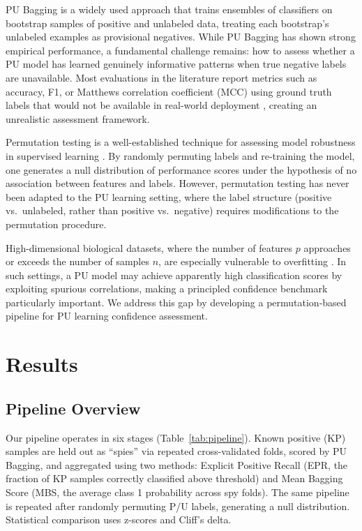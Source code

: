 \documentclass[11pt]{article}
\begin{document}
PU Bagging \citep{mordelet2014} is a widely used approach that trains ensembles of classifiers on bootstrap samples of positive and unlabeled data, treating each bootstrap's unlabeled examples as provisional negatives. While PU Bagging has shown strong empirical performance, a fundamental challenge remains: how to assess whether a PU model has learned genuinely informative patterns when true negative labels are unavailable. Most evaluations in the literature report metrics such as accuracy, F1, or Matthews correlation coefficient (MCC) using ground truth labels that would not be available in real-world deployment \citep{bekker2020}, creating an unrealistic assessment framework.

Permutation testing is a well-established technique for assessing model robustness in supervised learning \citep{ojala2010, combrisson2015, good2005, nichols2002}. By randomly permuting labels and re-training the model, one generates a null distribution of performance scores under the hypothesis of no association between features and labels. However, permutation testing has never been adapted to the PU learning setting, where the label structure (positive vs.\ unlabeled, rather than positive vs.\ negative) requires modifications to the permutation procedure.

High-dimensional biological datasets, where the number of features $p$ approaches or exceeds the number of samples $n$, are especially vulnerable to overfitting \citep{jolliffe2016}. In such settings, a PU model may achieve apparently high classification scores by exploiting spurious correlations, making a principled confidence benchmark particularly important. We address this gap by developing a permutation-based pipeline for PU learning confidence assessment.

\section{Results}

\subsection{Pipeline Overview}

Our pipeline operates in six stages (Table~\ref{tab:pipeline}). Known positive (KP) samples are held out as ``spies'' via repeated cross-validated folds, scored by PU Bagging, and aggregated using two methods: Explicit Positive Recall (EPR, the fraction of KP samples correctly classified above threshold) and Mean Bagging Score (MBS, the average class 1 probability across spy folds). The same pipeline is repeated after randomly permuting P/U labels, generating a null distribution. Statistical comparison uses z-scores and Cliff's delta.
\end{document}
